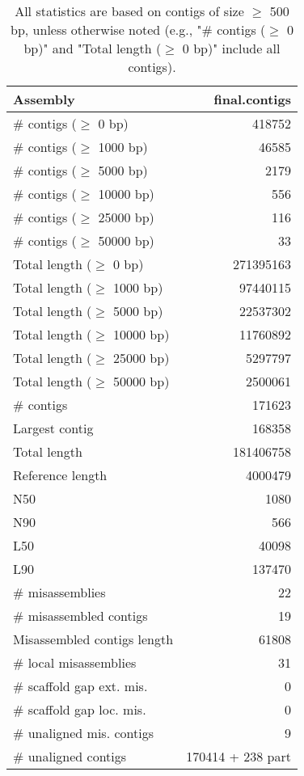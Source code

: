 \documentclass[12pt,a4paper]{article}
\begin{document}
\begin{table}[ht]
\begin{center}
\caption{All statistics are based on contigs of size $\geq$ 500 bp, unless otherwise noted (e.g., "\# contigs ($\geq$ 0 bp)" and "Total length ($\geq$ 0 bp)" include all contigs).}
\begin{tabular}{|l*{1}{|r}|}
\hline
Assembly & final.contigs \\ \hline
\# contigs ($\geq$ 0 bp) & 418752 \\ \hline
\# contigs ($\geq$ 1000 bp) & 46585 \\ \hline
\# contigs ($\geq$ 5000 bp) & 2179 \\ \hline
\# contigs ($\geq$ 10000 bp) & 556 \\ \hline
\# contigs ($\geq$ 25000 bp) & 116 \\ \hline
\# contigs ($\geq$ 50000 bp) & 33 \\ \hline
Total length ($\geq$ 0 bp) & 271395163 \\ \hline
Total length ($\geq$ 1000 bp) & 97440115 \\ \hline
Total length ($\geq$ 5000 bp) & 22537302 \\ \hline
Total length ($\geq$ 10000 bp) & 11760892 \\ \hline
Total length ($\geq$ 25000 bp) & 5297797 \\ \hline
Total length ($\geq$ 50000 bp) & 2500061 \\ \hline
\# contigs & 171623 \\ \hline
Largest contig & 168358 \\ \hline
Total length & 181406758 \\ \hline
Reference length & 4000479 \\ \hline
N50 & 1080 \\ \hline
N90 & 566 \\ \hline
L50 & 40098 \\ \hline
L90 & 137470 \\ \hline
\# misassemblies & 22 \\ \hline
\# misassembled contigs & 19 \\ \hline
Misassembled contigs length & 61808 \\ \hline
\# local misassemblies & 31 \\ \hline
\# scaffold gap ext. mis. & 0 \\ \hline
\# scaffold gap loc. mis. & 0 \\ \hline
\# unaligned mis. contigs & 9 \\ \hline
\# unaligned contigs & 170414 + 238 part \\ \hline

\end{tabular}
\end{center}
\end{table}
\end{document}
